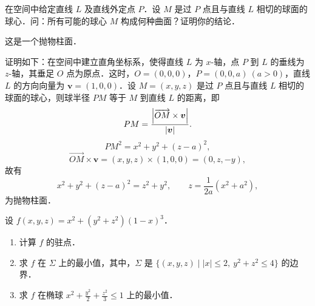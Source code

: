 
在空间中给定直线 $L$ 及直线外定点 $P$．设 $M$ 是过 $P$ 点且与直线 $L$ 相切的球面的球心．问：所有可能的球心 $M$ 构成何种曲面？证明你的结论．

\begin{solution}
这是一个抛物柱面．

证明如下：在空间中建立直角坐标系，使得直线 $L$ 为 $x$-轴，点 $P$ 到 $L$ 的垂线为 $z$-轴，其垂足 $O$ 点为原点．这时，$O=(0,0,0)$，$P=(0,0,a)\ (a>0)$，直线 $L$ 的方向向量为 $\bm{v}=(1,0,0)$．设 $M=(x,y,z)$ 是过 $P$ 点且与直线 $L$ 相切的球面的球心，则球半径 $PM$ 等于 $M$ 到直线 $L$ 的距离，即
\[
PM=\frac{\left|\overrightarrow{OM}\times\bm{v}\right|}{\left|\bm{v}\right|}.
\]
\[
PM^{2}=x^{2}+y^{2}+(z-a)^{2},
\]
\[
\overrightarrow{OM}\times\bm{v}=(x,y,z)\times(1,0,0)=(0,z,-y),
\]
故有
\[
x^{2}+y^{2}+(z-a)^{2}=z^{2}+y^{2},\qquad z=\frac{1}{2a}\left(x^{2}+a^{2}\right),
\]
为抛物柱面．
\end{solution}

设 $f(x,y,z)=x^{2}+(y^{2}+z^{2})(1-x)^{3}$．
\begin{enumerate}[label=(\arabic*)]
  \item 计算 $f$ 的驻点．
  \item 求 $f$ 在 $\Sigma$ 上的最小值，其中，$\Sigma$ 是 $\{(x,y,z)\mid |x|\le 2,\ y^{2}+z^{2}\le 4\}$ 的边界．
  \item 求 $f$ 在椭球 $x^{2}+\frac{y^{2}}{2}+\frac{z^{2}}{3}\le 1$ 上的最小值．
\end{enumerate}

